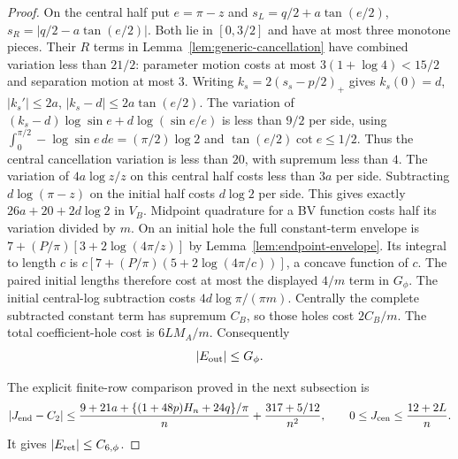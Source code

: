 \begin{proof}
On the central half put $e=\pi-z$ and
$s_L=q/2+a\tan(e/2)$, $s_R=|q/2-a\tan(e/2)|$.
Both lie in $[0,3/2]$ and have at most three monotone pieces.
Their $R$ terms in Lemma~\ref{lem:generic-cancellation} have combined
variation less than $21/2$: parameter motion costs at most
$3(1+\log4)<15/2$ and separation motion at most $3$.
Writing $k_s=2(s_s-p/2)_+$ gives $k_s(0)=d$,
$|k_s'|\leq2a$, $|k_s-d|\leq2a\tan(e/2)$.
The variation of
$(k_s-d)\log\sin e+d\log(\sin e/e)$ is less than $9/2$ per side,
using $\int_0^{\pi/2}-\log\sin e\,de=(\pi/2)\log2$ and
$\tan(e/2)\cot e\leq1/2$. Thus the central cancellation variation
is less than $20$, with supremum less than $4$.
The variation of $4a\log z/z$ on this central half costs less than
$3a$ per side. Subtracting $d\log(\pi-z)$ on the initial half costs
$d\log2$ per side. This gives exactly $26a+20+2d\log2$ in $V_B$.
Midpoint quadrature for a BV function costs half its variation divided
by $m$. On an initial hole the full constant-term envelope is
$7+(P/\pi)[3+2\log(4\pi/z)]$ by
Lemma~\ref{lem:endpoint-envelope}. Its integral to length $c$ is
$c[7+(P/\pi)(5+2\log(4\pi/c))]$, a concave function of $c$.
The paired initial lengths therefore cost at most the displayed $4/m$
term in $G_\phi$. The initial central-log subtraction costs
$4d\log\pi/(\pi m)$. Centrally the complete subtracted constant
term has supremum $C_B$, so those holes cost $2C_B/m$.
The total coefficient-hole cost is $6LM_A/m$. Consequently
\begin{equation}\label{eq:outer-global-bound}
 |E_{\rm out}|\leq G_\phi.
\end{equation}

The explicit finite-row comparison proved in the next subsection is
\begin{equation}\label{eq:four-rows-global-bound}
 |J_{\rm end}-C_2|
 \leq\frac{9+21a+\{(1+48p)H_n+24q\}/\pi}{n}
                   +\frac{317+5/12}{n^2},\qquad
 0\leq J_{\rm cen}\leq\frac{12+2L}{n}.
\end{equation}
It gives $|E_{\rm ret}|\leq C_{6,\phi}$.


\end{proof}
